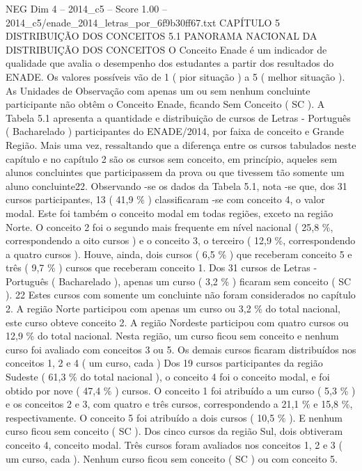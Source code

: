 \begin{textsample}{NEG Dim 4 – 2014\_c5 – Score 1.00 – 2014\_c5/enade\_2014\_letras\_por\_6f9b30ff67.txt}  \label{ex:f4_neg_201}
CAPÍTULO 5 DISTRIBUIÇÃO DOS CONCEITOS 5.1 PANORAMA NACIONAL DA DISTRIBUIÇÃO DOS CONCEITOS O Conceito Enade é um indicador de qualidade que avalia o desempenho dos estudantes a partir dos resultados do ENADE.
Os valores possíveis vão de 1 ( pior situação ) a 5 ( melhor situação ).
As Unidades de Observação com apenas um ou sem nenhum concluinte participante não obtêm o Conceito Enade, ficando Sem Conceito ( SC ).
A Tabela 5.1 apresenta a quantidade e distribuição de cursos de Letras - Português ( Bacharelado ) participantes do ENADE/2014, por faixa de conceito e Grande Região.
Mais uma vez, ressaltando que a diferença entre os cursos tabulados neste capítulo e no capítulo 2 são os cursos sem conceito, em princípio, aqueles sem alunos concluintes que participassem da prova ou que tivessem tão somente um aluno concluinte22.
Observando -se os dados da Tabela 5.1, nota -se que, dos 31 cursos participantes, 13 ( 41,9 \% ) classificaram -se com conceito 4, o valor modal.
Este foi também o conceito modal em todas regiões, exceto na região Norte.
O conceito 2 foi o segundo mais frequente em nível nacional ( 25,8 \%, correspondendo a oito cursos ) e o conceito 3, o terceiro ( 12,9 \%, correspondendo a quatro cursos ).
Houve, ainda, dois cursos ( 6,5 \% ) que receberam conceito 5 e três ( 9,7 \% ) cursos que receberam conceito 1.
Dos 31 cursos de Letras - Português ( Bacharelado ), apenas um curso ( 3,2 \% ) ficaram sem conceito ( SC ). 22 Estes cursos com somente um concluinte não foram considerados no capítulo 2.
A região Norte participou com apenas um curso ou 3,2 \% do total nacional, este curso obteve conceito 2.
A região Nordeste participou com quatro cursos ou 12,9 \% do total nacional.
Nesta região, um curso ficou sem conceito e nenhum curso foi avaliado com conceitos 3 ou 5.
Os demais cursos ficaram distribuídos nos conceitos 1, 2 e 4 ( um curso, cada ) Dos 19 cursos participantes da região Sudeste ( 61,3 \% do total nacional ), o conceito 4 foi o conceito modal, e foi obtido por nove ( 47,4 \% ) cursos.
O conceito 1 foi atribuído a um curso ( 5,3 \% ) e os conceitos 2 e 3, com quatro e três cursos, correspondendo a 21,1 \% e 15,8 \%, respectivamente.
O conceito 5 foi atribuído a dois cursos ( 10,5 \% ).
E nenhum curso ficou sem conceito ( SC ).
Dos cinco cursos da região Sul, dois obtiveram conceito 4, conceito modal.
Três cursos foram avaliados nos conceitos 1, 2 e 3 ( um curso, cada ).
Nenhum curso ficou sem conceito ( SC ) ou com conceito 5.

\end{textsample}
